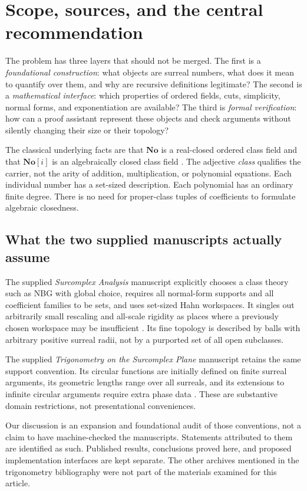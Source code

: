 \documentclass[11pt,letterpaper]{article}
\numberwithin{equation}{section}
\theoremstyle{definition}
\theoremstyle{remark}
\newcommand{\No}{\mathbf{No}}
\newcommand{\SC}{\mathbf{No}[i]}
\begin{document}
\section{Scope, sources, and the central recommendation}\label{sec:scope}
The problem has three layers that should not be merged. The first is a \emph{foundational construction}: what objects are surreal numbers, what does it mean to quantify over them, and why are recursive definitions legitimate? The second is a \emph{mathematical interface}: which properties of ordered fields, cuts, simplicity, normal forms, and exponentiation are available? The third is \emph{formal verification}: how can a proof assistant represent these objects and check arguments without silently changing their size or their topology?

The classical underlying facts are that $\No$ is a real-closed ordered class field and that $\SC$ is an algebraically closed class field \cite{Conway,Gonshor,Alling}. The adjective \emph{class} qualifies the carrier, not the arity of addition, multiplication, or polynomial equations. Each individual number has a set-sized description. Each polynomial has an ordinary finite degree. There is no need for proper-class tuples of coefficients to formulate algebraic closedness.

\subsection{What the two supplied manuscripts actually assume}
The supplied \emph{Surcomplex Analysis} manuscript explicitly chooses a class theory such as NBG with global choice, requires all normal-form supports and all coefficient families to be sets, and uses set-sized Hahn workspaces. It singles out arbitrarily small rescaling and all-scale rigidity as places where a previously chosen workspace may be insufficient \cite[\S2.1 and \S4.1]{AnalysisSource}. Its fine topology is described by balls with arbitrary positive surreal radii, not by a purported set of all open subclasses.

The supplied \emph{Trigonometry on the Surcomplex Plane} manuscript retains the same support convention. Its circular functions are initially defined on finite surreal arguments, its geometric lengths range over all surreals, and its extensions to infinite circular arguments require extra phase data \cite[\S\S2--4 and 16]{TrigSource}. These are substantive domain restrictions, not presentational conveniences.

Our discussion is an expansion and foundational audit of those conventions, not a claim to have machine-checked the manuscripts. Statements attributed to them are identified as such. Published results, conclusions proved here, and proposed implementation interfaces are kept separate. The other archives mentioned in the trigonometry bibliography were not part of the materials examined for this article.
\end{document}
